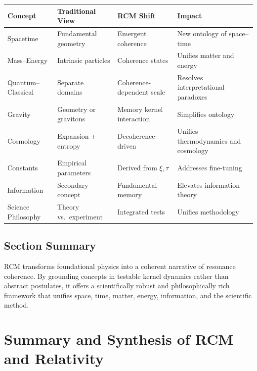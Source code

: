 \begin{center}
\begin{tabular}{|l|l|l|l|}
\hline
Concept           & Traditional View          & RCM Shift                           & Impact                              \\ \hline
Spacetime         & Fundamental geometry      & Emergent coherence                  & New ontology of space–time          \\ \hline
Mass–Energy       & Intrinsic particles       & Coherence states                    & Unifies matter and energy           \\ \hline
Quantum–Classical & Separate domains          & Coherence-dependent scale           & Resolves interpretational paradoxes \\ \hline
Gravity           & Geometry or gravitons     & Memory kernel interaction           & Simplifies ontology                 \\ \hline
Cosmology         & Expansion + entropy       & Decoherence-driven                  & Unifies thermodynamics and cosmology\\ \hline
Constants         & Empirical parameters      & Derived from \(\xi,\tau\)           & Addresses fine-tuning               \\ \hline
Information       & Secondary concept         & Fundamental memory                  & Elevates information theory         \\ \hline
Science Philosophy& Theory vs.\ experiment   & Integrated tests                    & Unifies methodology                 \\ \hline
\end{tabular}
\end{center}

\subsection{Section Summary}

RCM transforms foundational physics into a coherent narrative of resonance coherence. By grounding concepts in testable kernel dynamics rather than abstract postulates, it offers a scientifically robust and philosophically rich framework that unifies space, time, matter, energy, information, and the scientific method.

\section{Summary and Synthesis of RCM and Relativity}

